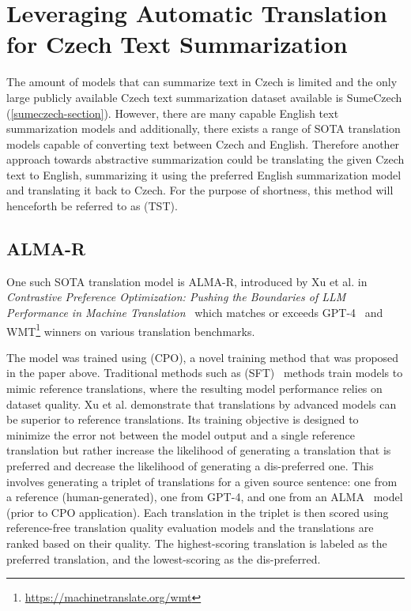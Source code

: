 \documentclass[english, ba, kiv, he, iso690numb, pdf, viewonly]{fasthesis}
\begin{document}
\section{Leveraging Automatic Translation for Czech Text Summarization}\label{methods:translate}
The amount of models that can summarize text in Czech is limited and the only large publicly available Czech text summarization dataset available is SumeCzech (\ref{sumeczech-section}). However, there are many capable English text summarization models and additionally, there exists a range of SOTA translation models capable of converting text between Czech and English. Therefore another approach towards abstractive summarization could be translating the given Czech text to English, summarizing it using the preferred English summarization model and translating it back to Czech. For the purpose of shortness, this method will henceforth be referred to as  (TST).
\subsection{ALMA-R}
One such SOTA translation model is ALMA-R, introduced by Xu et al. in \textit{Contrastive Preference Optimization: Pushing the Boundaries of LLM Performance in Machine Translation}~\cite{xu2024contrastive} which matches or exceeds GPT-4~\cite{openai2024gpt4} and WMT\footnote{\url{https://machinetranslate.org/wmt}} winners on various translation benchmarks. 

The model was trained using  (CPO), a novel training method that was proposed in the paper above. Traditional methods such as  (SFT)~\cite{goodfellow2016deep} methods train models to mimic reference translations, where the resulting model performance relies on dataset quality. Xu et al. demonstrate that translations by advanced models can be superior to reference translations. Its training objective is designed to minimize the error not between the model output and a single reference translation but rather increase the likelihood of generating a translation that is preferred and decrease the likelihood of generating a dis-preferred one. This involves generating a triplet of translations for a given source sentence: one from a reference (human-generated), one from GPT-4, and one from an ALMA~\cite{xu2024paradigm} model (prior to CPO application). Each translation in the triplet is then scored using reference-free translation quality evaluation models and the translations are ranked based on their quality. The highest-scoring translation is labeled as the preferred translation, and the lowest-scoring as the dis-preferred. 
\end{document}
